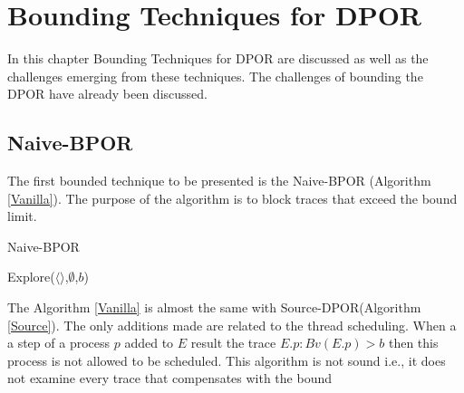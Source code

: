 \chapter{Bounding Techniques for DPOR}
\label{bounded}

In this chapter Bounding Techniques for DPOR are discussed as well as the challenges emerging from these techniques.
The challenges of bounding the DPOR have already been discussed.


\section{Naive-BPOR}

The first bounded technique to be presented is the Naive-BPOR (Algorithm \ref{Vanilla}). The purpose of the algorithm is to block traces that exceed the bound
limit. 

\begin{algorithm}
    \caption{Naive-BPOR}
    \label{Vanilla}
    Explore($\langle \rangle$,$\emptyset$,$b$)\;
\end{algorithm}

The Algorithm \ref{Vanilla} is almost the same with Source-DPOR(Algorithm \ref{Source}). The only additions made are related to the 
thread scheduling. When a a step of a process $p$ added to $E$ result the trace $E.p : Bv(E.p) > b$ then this process is not allowed to be scheduled.
This algorithm is not sound i.e., it does not examine every trace that compensates with the bound

